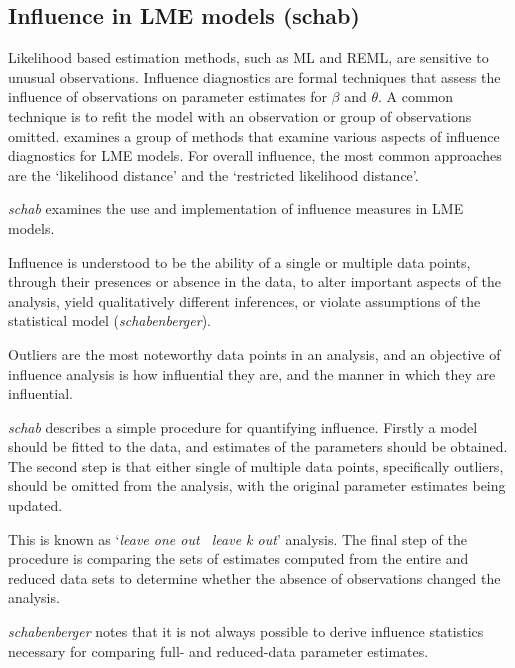 \documentclass[Main.tex]{subfiles}
\begin{document}
		
		\subsection{Influence in LME models (schab)}
		Likelihood based estimation methods, such as ML and REML, are sensitive to unusual observations. Influence diagnostics are formal techniques that assess the influence of observations on parameter estimates for $\beta$ and $\theta$. A common technique is to refit the model with an observation or group of observations omitted.\citet{west} examines a group of methods that examine various aspects of influence diagnostics for LME models.
		For overall influence, the most common approaches are the `likelihood distance' and the `restricted likelihood distance'.
		
		\emph{schab} examines the use and implementation of influence measures in LME models.
		
		Influence is understood to be the ability of a single or multiple
		data points, through their presences or absence in the data, to
		alter important aspects of the analysis, yield qualitatively
		different inferences, or violate assumptions of the statistical
		model (\textit{schabenberger}).
		
		Outliers are the most noteworthy data points in an analysis, and
		an objective of influence analysis is how influential they are,
		and the manner in which they are influential.
		
		\emph{schab} describes a simple procedure for quantifying
		influence. Firstly a model should be fitted to the data, and
		estimates of the parameters should be obtained. The second step is
		that either single of multiple data points, specifically outliers,
		should be omitted from the analysis, with the original parameter
		estimates being updated. 
		
		This is known as `\textit{leave one out \ leave k
			out}' analysis. The final step of the procedure is comparing the
		sets of estimates computed from the entire and reduced data sets
		to determine whether the absence of observations changed the
		analysis.
		
		\textit{schabenberger} notes that it is not always possible to
		derive influence statistics necessary for comparing full- and
		reduced-data parameter estimates. 
		
		
\end{document}
